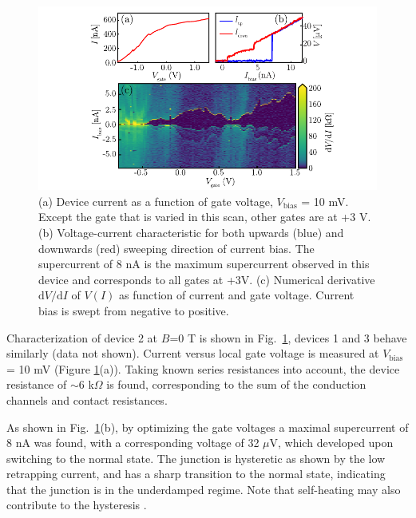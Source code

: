\begin{figure}
\begin{center}
\includegraphics[width=\columnwidth]{chapter_supercurrent/figures/sup_fig1.pdf}
\caption{(a) Device current as a function of gate voltage, $V_\mathrm{bias}$ = 10 mV.
Except the gate that is varied in this scan, other gates are at +3 V.
(b) Voltage-current characteristic for both upwards (blue) and downwards (red) sweeping direction of current bias.
The supercurrent of 8 nA is the maximum supercurrent observed in this device and corresponds to all gates at +3V.
(c) Numerical derivative $\mathrm{d}V/\mathrm{d}I$ of $V\left(I\right)$ as function of current and gate voltage.
Current bias is swept from negative to positive.}
\label{fig:charaterization_D1}
\end{center}
\end{figure}

Characterization of device 2 at $B$=0 T is shown in Fig.~\ref{fig:charaterization_D1}, devices 1 and 3 behave similarly (data not shown).
Current versus local gate voltage is measured at $V_{\text{bias}}$ = 10 mV (Figure \ref{fig:charaterization_D1}(a)).
Taking known series resistances into account, the device resistance of $\sim$6 k$\Omega$ is found, corresponding to the sum of the conduction channels and contact resistances.

As shown in Fig.~\ref{fig:charaterization_D1}(b), by optimizing the gate voltages a maximal supercurrent of 8 nA was found, with a corresponding voltage of 32 $\mu$V, which developed upon switching to the normal state.
The junction is hysteretic as shown by the low retrapping current, and has a sharp transition to the normal state, indicating that the junction is in the underdamped regime.
Note that self-heating may also contribute to the hysteresis \cite{Courtois2008}.

